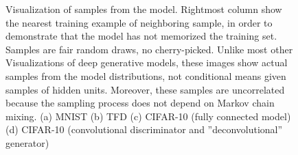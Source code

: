 \begin{figure}[htb]
	\centering
	\caption{Visualization of samples from the model. Rightmost column show the nearest training example of neighboring sample, in order to demonstrate that the model has not memorized the training set. Samples are fair random draws, no cherry-picked. Unlike most other Visualizations of deep generative models, these images show actual samples from the model distributions, not conditional means given samples of hidden units. Moreover, these samples are uncorrelated because the sampling process does not depend on Markov chain mixing. (a) MNIST (b) TFD (c) CIFAR-10 (fully connected model) (d) CIFAR-10 (convolutional discriminator and ''deconvolutional'' generator)}
	\label{fig: figure 2}
\end{figure}

